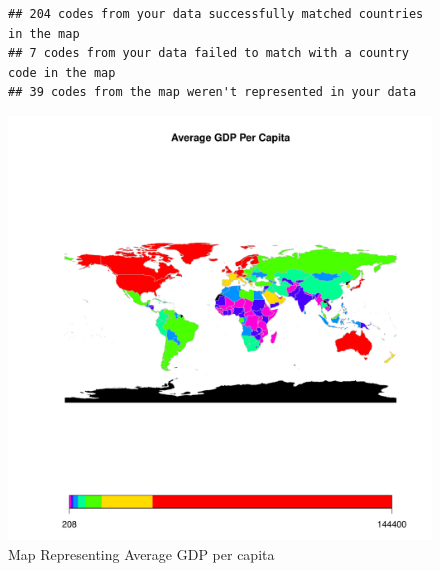 \documentclass{article}\usepackage[]{graphicx}\usepackage[]{xcolor}
\makeatletter
\def\maxwidth{ %
  \ifdim\Gin@nat@width>\linewidth
    \linewidth
  \else
    \Gin@nat@width
  \fi
}
\newenvironment{kframe}{%
 \def\at@end@of@kframe{}%
 \ifinner\ifhmode%
  \def\at@end@of@kframe{\end{minipage}}%
  \begin{minipage}{\columnwidth}%
 \fi\fi%
 \def\FrameCommand##1{\hskip\@totalleftmargin \hskip-\fboxsep
 \colorbox{shadecolor}{##1}\hskip-\fboxsep
     \hskip-\linewidth \hskip-\@totalleftmargin \hskip\columnwidth}%
 \MakeFramed {\advance\hsize-\width
   \@totalleftmargin\z@ \linewidth\hsize
   \@setminipage}}%
 {\par\unskip\endMakeFramed%
 \at@end@of@kframe}
\newenvironment{knitrout}{}{} %
\makeatother
\begin{document}
\begin{figure}[h!]
\centering
\begin{knitrout}
\color{fgcolor}\begin{kframe}
\begin{verbatim}
## 204 codes from your data successfully matched countries in the map
## 7 codes from your data failed to match with a country code in the map
## 39 codes from the map weren't represented in your data
\end{verbatim}
\end{kframe}
\includegraphics[width=\maxwidth]{figure/unnamed-chunk-20-1} 
\end{knitrout}
\caption{Map Representing Average GDP per capita}

\label{fig}
\end{figure}


\newpage
\end{document}
